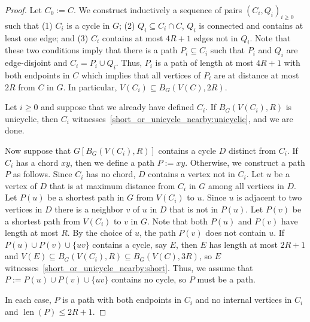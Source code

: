 \documentclass{patmorin}
\DeclareMathOperator{\len}{len}
\begin{document}
\begin{proof}
  Let $C_0:=C$.
  We construct inductively a sequence of pairs $(C_i,Q_i)_{i\geq0}$ such that
  (1) $C_i$ is a cycle in $G$;
  (2) $Q_i\subseteq C_i\cap C$, $Q_i$ is connected and contains at least one edge; and
  (3) $C_i$ contains at most $4R+1$ edges not in $Q_i$.
  Note that these two conditions imply that there is a path $P_i\subseteq C_i$  such that
  $P_i$ and $Q_i$ are edge-disjoint and $C_i=P_i\cup Q_i$.
  Thus, $P_i$ is a path of length at most $4R+1$ with both endpoints in $C$
  which implies that all vertices of $P_i$ are at distance at most $2R$ from $C$ in $G$.
  In particular, $V(C_i)\subseteq B_G(V(C),2R)$.

  Let $i\geq0$ and suppose that we already have defined $C_i$.
  If $B_G(V(C_i),R)$ is unicyclic, then $C_i$ witnesses~\eqref{short_or_unicycle_nearby:unicyclic}, and we are done. 

  Now suppose that $G[B_G(V(C_i),R)]$ contains a cycle $D$ distinct from $C_i$.  If $C_i$ has a chord $xy$, then we define a path $P:=xy$.  Otherwise, we construct a path $P$ as follows. Since $C_i$ has no chord, $D$ contains a vertex not in $C_i$.  Let $u$ be a vertex of $D$ that is at maximum distance from $C_i$ in $G$ among all vertices in $D$.
  Let $P(u)$ be a shortest path in $G$ from $V(C_i)$ to $u$. 
  Since $u$ is adjacent to two vertices in $D$ there is a neighbor $v$ of $u$ in $D$ that is not in $P(u)$.
  Let $P(v)$ be a shortest path from $V(C_i)$ to $v$ in $G$.
  Note that both $P(u)$ and $P(v)$ have length at most $R$.
  By the choice of $u$, the path $P(v)$ does not contain $u$.
  If $P(u)\cup P(v)\cup\{uv\}$ contains a cycle, say $E$, then $E$ has length at most $2R+1$ and $V(E)\subseteq B_G(V(C_i),R)\subseteq B_G(V(C),3R)$, so $E$ witnesses~\eqref{short_or_unicycle_nearby:short}.
  Thus, we assume that $P:=P(u)\cup P(v)\cup\{uv\}$ contains no cycle, so $P$ must be a path.

  In each case, $P$ is a path with both endpoints in $C_i$ and no internal vertices in $C_i$ and $\len(P)\le 2R+1$.


\end{proof}
\end{document}
